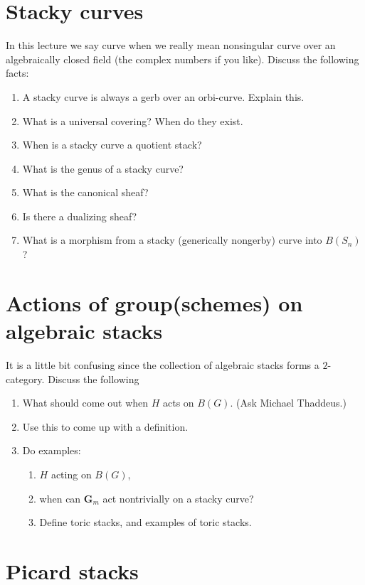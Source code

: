 \section{Stacky curves}
\label{section-stacky-curves}

\noindent
In this lecture we say curve when we really mean nonsingular curve
over an algebraically closed field (the complex numbers if you like).
Discuss the following facts:
\begin{enumerate}
\item A stacky curve is always a gerb over an orbi-curve. Explain this.
\item What is a universal covering? When do they exist.
\item When is a stacky curve a quotient stack?
\item What is the genus of a stacky curve?
\item What is the canonical sheaf?
\item Is there a dualizing sheaf?
\item What is a morphism from a stacky (generically nongerby) curve
into $B(S_n)$?
\end{enumerate}

\section{Actions of group(schemes) on algebraic stacks}
\label{section-actions}

\noindent
It is a little bit confusing since the collection of algebraic stacks
forms a $2$-category. Discuss the following
\begin{enumerate}
\item What should come out when $H$ acts on $B(G)$. (Ask Michael Thaddeus.)
\item Use this to come up with a definition.
\item Do examples:
\begin{enumerate}
\item $H$ acting on $B(G)$,
\item when can $\mathbf{G}_m$ act nontrivially on a stacky curve?
\item Define toric stacks, and examples of toric stacks.
\end{enumerate}
\end{enumerate}


\section{Picard stacks}
\label{section-picard}

